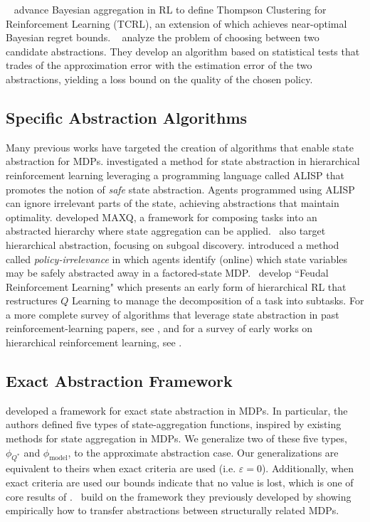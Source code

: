 ~\citet{mandelefficient} advance Bayesian aggregation in RL to define Thompson Clustering for Reinforcement Learning (TCRL), an extension of which achieves near-optimal Bayesian regret bounds. ~\citet{Jiang2015} analyze the problem of choosing between two candidate abstractions. They develop an algorithm based on statistical tests that trades of the approximation error with the estimation error of the two abstractions, yielding a loss bound on the quality of the chosen policy.

\subsection{Specific Abstraction Algorithms}
Many previous works have targeted the creation of algorithms that enable state abstraction for MDPs. \citet{andre2002state} investigated a method for state abstraction in hierarchical reinforcement learning leveraging a programming language called ALISP that promotes the notion of {\it safe} state abstraction. Agents programmed using ALISP can ignore irrelevant parts of the state, achieving abstractions that maintain optimality. \citet{dietterich2000hierarchical} developed MAXQ, a framework for composing tasks into an abstracted hierarchy where state aggregation can be applied.~\citet{bakker2004hierarchical} also target hierarchical abstraction, focusing on subgoal discovery. \citet{jong2005state} introduced a method called {\it policy-irrelevance} in which agents identify (online) which state variables may be safely abstracted away in a factored-state \ac{MDP}.~\citet{Dayan1993} develop ``Feudal Reinforcement Learning" which presents an early form of hierarchical RL that restructures $Q$ Learning to manage the decomposition of a task into subtasks. For a more complete survey of algorithms that leverage state abstraction in past reinforcement-learning papers, see \citet{li2006towards}, and for a survey of early works on hierarchical reinforcement learning, see \citet{barto2003recent}.


\subsection{Exact Abstraction Framework}

\citet{li2006towards} developed a framework for exact state abstraction in \acp{MDP}. In particular, the authors defined five types of state-aggregation functions, inspired by existing methods for state aggregation in \acp{MDP}. We generalize two of these five types, $\phi_{Q^*}$ and $\phi_{\text{model}}$, to the approximate abstraction case. Our generalizations are equivalent to theirs when exact criteria are used (i.e. $\varepsilon = 0$). Additionally, when exact criteria are used our bounds indicate that no value is lost, which is one of core results of \citet{li2006towards}.~\citet{walsh2006transferring} build on the framework they previously developed by showing empirically how to transfer abstractions between structurally related MDPs.


